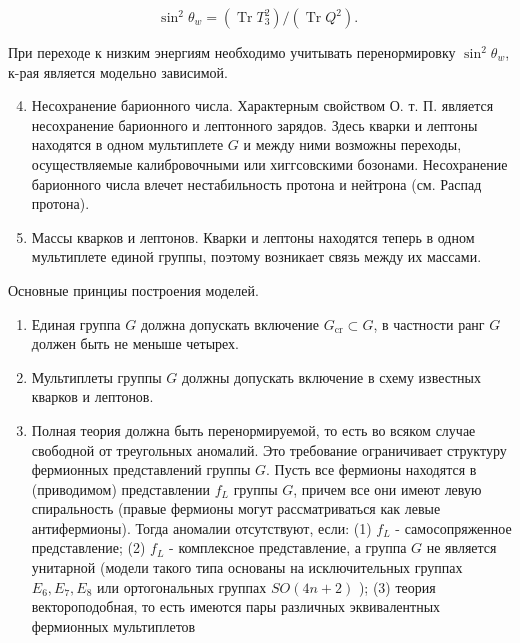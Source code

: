 \documentclass[10pt]{article}
\begin{document}
\[

\sin ^{2} \theta_{w}=\left(\operatorname{Tr} T_{3}^{2}\right) /\left(\operatorname{Tr} Q^{2}\right) \text {. }

\]



При переходе к низким энергиям необходимо учитывать перенормировку $\sin ^{2} \theta_{w}$, к-рая является модельно зависимой.



\begin{enumerate}

  \setcounter{enumi}{3}

  \item Несохранение барионного числа. Характерным свойством О. т. П. является несохранение барионного и лептонного зарядов. Здесь кварки и лептоны находятся в одном мультиплете $G$ и между ними возможны переходы, осуществляемые калибровочными или хиггсовскими бозонами. Несохранение барионного числа влечет нестабильность протона и нейтрона (см. Распад протона).



  \item Массы кварков и лептонов. Кварки и лептоны находятся теперь в одном мультиплете единой группы, поэтому возникает связь между их массами.



\end{enumerate}



Основные принциы построения моделей.



\begin{enumerate}

  \item Единая группа $G$ должна допускать включение $G_{\mathrm{cr}} \subset G$, в частности ранг $G$ должен быть не меныше четырех.



  \item Мультиплеты группы $G$ должны допускать включение в схему известных кварков и лептонов.



  \item Полная теория должна быть перенормируемой, то есть во всяком случае свободной от треугольных аномалий. Это требование ограничивает структуру фермионных представлений группы $G$. Пусть все фермионы находятся в (приводимом) представлении $f_{L}$ группы $G$, причем все они имеют левую спиральность (правые фермионы могут рассматриваться как левые антифермионы). Тогда аномалии отсутствуют, если: (1) $f_{L}$ - самосопряженное представление; (2) $f_{L}$ - комплексное представление, а группа $G$ не является унитарной (модели такого типа основаны на исключительных группах $E_{6}, E_{7}, E_{8}$ или ортогональных группах $S O(4 n+2)$ ); (3) теория вектороподобная, то есть имеются пары различных эквивалентных фермионных мультиплетов



\end{enumerate}
\end{document}
